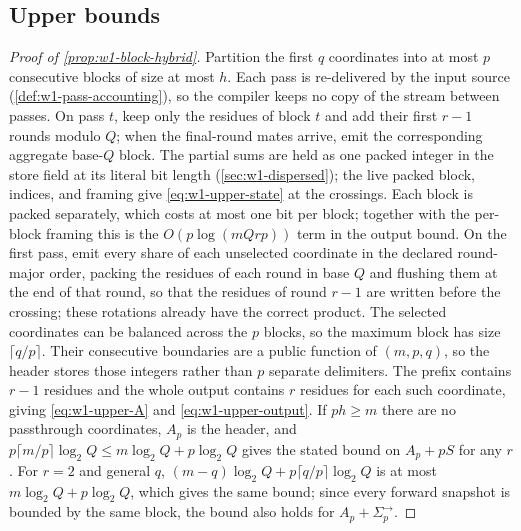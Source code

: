 \subsection{Upper bounds}

\begin{proof}[Proof of \cref{prop:w1-block-hybrid}]
Partition the first $q$ coordinates into at most $p$ consecutive blocks of
size at most $h$.  Each pass is re-delivered by the input source
(\cref{def:w1-pass-accounting}), so the compiler keeps no copy of the
stream between passes.  On pass $t$, keep only the residues of block $t$ and add
their first $r-1$ rounds modulo $Q$; when the final-round mates arrive,
emit the corresponding aggregate base-$Q$ block.  The partial sums are held
as one packed integer in the store field at its literal bit
length (\cref{sec:w1-dispersed}); the live packed block, indices, and framing
give \eqref{eq:w1-upper-state} at the crossings.  Each block is packed
separately, which
costs at most one bit per block; together with the per-block framing this is
the $O(p\log(mQrp))$ term in the output bound.  On the first pass,
emit every share of each unselected coordinate in the declared round-major
order, packing the residues of each round in base $Q$ and flushing them
at the end of that round, so that the residues of round $r-1$ are written
before the crossing; these rotations already have the correct product.  The selected coordinates can be balanced
across the $p$ blocks, so the maximum block has size $\lceil q/p\rceil$.
Their consecutive boundaries are a public function of $(m,p,q)$, so the
header stores those integers rather than $p$ separate delimiters.
The prefix contains $r-1$ residues and the
whole output contains $r$ residues for each such coordinate, giving
\eqref{eq:w1-upper-A} and \eqref{eq:w1-upper-output}.  If $ph\geq m$ there
are no passthrough coordinates, $A_p$ is the header, and
$p\lceil m/p\rceil\log_2Q\leq m\log_2Q+p\log_2Q$ gives the stated bound on
$A_p+pS$ for any $r$.  For $r=2$ and general $q$, $(m-q)\log_2Q+p\lceil
q/p\rceil\log_2Q$ is at most $m\log_2Q+p\log_2Q$, which gives the same
bound; since every forward snapshot is bounded by the same
block, the bound also holds for $A_p+\Sigma^{\to}_p$.
\end{proof}

